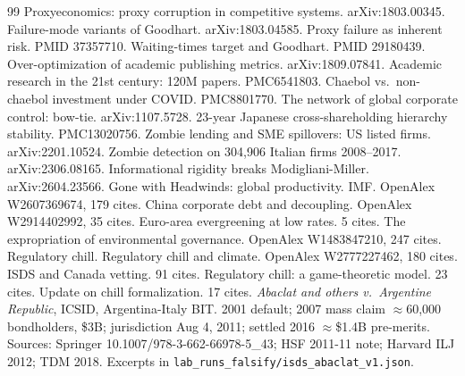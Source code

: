 \documentclass[11pt]{article}
\begin{document}
\begin{thebibliography}{99}
 Proxyeconomics: proxy corruption in competitive systems. arXiv:1803.00345.
 Failure-mode variants of Goodhart. arXiv:1803.04585.
 Proxy failure as inherent risk. PMID 37357710.
 Waiting-times target and Goodhart. PMID 29180439.
 Over-optimization of academic publishing metrics. arXiv:1809.07841.
 Academic research in the 21st century: 120M papers. PMC6541803.
 Chaebol vs.\ non-chaebol investment under COVID. PMC8801770.
 The network of global corporate control: bow-tie. arXiv:1107.5728.
 23-year Japanese cross-shareholding hierarchy stability. PMC13020756.
 Zombie lending and SME spillovers: US listed firms. arXiv:2201.10524.
 Zombie detection on 304,906 Italian firms 2008--2017. arXiv:2306.08165.
 Informational rigidity breaks Modigliani-Miller. arXiv:2604.23566.
 Gone with Headwinds: global productivity. IMF. OpenAlex W2607369674, 179 cites.
 China corporate debt and decoupling. OpenAlex W2914402992, 35 cites.
 Euro-area evergreening at low rates. 5 cites.
 The expropriation of environmental governance. OpenAlex W1483847210, 247 cites. Regulatory chill.
 Regulatory chill and climate. OpenAlex W2777227462, 180 cites.
 ISDS and Canada vetting. 91 cites.
 Regulatory chill: a game-theoretic model. 23 cites.
 Update on chill formalization. 17 cites.
 \textit{Abaclat and others v.\ Argentine Republic}, ICSID, Argentina-Italy BIT. 2001 default; 2007 mass claim $\approx$60,000 bondholders, \$3B; jurisdiction Aug 4, 2011; settled 2016 $\approx$\$1.4B pre-merits. Sources: Springer 10.1007/978-3-662-66978-5\_43; HSF 2011-11 note; Harvard ILJ 2012; TDM 2018. Excerpts in \texttt{lab\_runs\_falsify/isds\_abaclat\_v1.json}.

\end{thebibliography}
\end{document}
